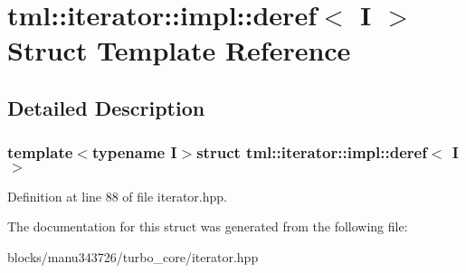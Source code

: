 \hypertarget{structtml_1_1iterator_1_1impl_1_1deref}{\section{tml\+:\+:iterator\+:\+:impl\+:\+:deref$<$ I $>$ Struct Template Reference}
\label{structtml_1_1iterator_1_1impl_1_1deref}
}


\subsection{Detailed Description}
\subsubsection*{template$<$typename I$>$struct tml\+::iterator\+::impl\+::deref$<$ I $>$}



Definition at line 88 of file iterator.\+hpp.



The documentation for this struct was generated from the following file\+:\begin{DoxyCompactItemize}
\item 
blocks/manu343726/turbo\+\_\+core/iterator.\+hpp\end{DoxyCompactItemize}
